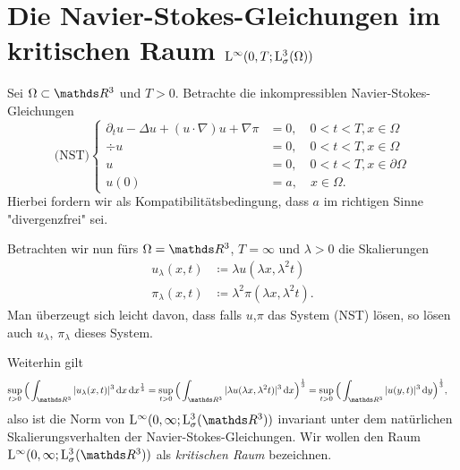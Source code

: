 \chapter{Die Navier-Stokes-Gleichungen im kritischen Raum $\mathrm{L}^\infty(0,T; \mathrm{L}^3_\sigma(\Omega))$}

Sei $\Omega \subset \R^3$ und $T > 0$.
Betrachte die inkompressiblen Navier-Stokes-Gleichungen
$$
\text{(NST)} \begin{cases}
  \partial_t u - \Delta u + (u \cdot \nabla) u + \nabla \pi &= 0, \quad 0 < t < T, x \in \Omega \\
  \div u &= 0, \quad 0 < t < T, x \in \Omega \\
  u &= 0, \quad 0 < t < T, x \in \partial\Omega \\
  u(0) &= a, \quad x \in \Omega.
\end{cases}
$$
Hierbei fordern wir als Kompatibilitätsbedingung, dass $a$ im richtigen Sinne "divergenzfrei" sei.

Betrachten wir nun fürs $\Omega = \R^3$, $T = \infty$ und $\lambda > 0$ die Skalierungen
\begin{align*}
  u_\lambda(x,t)  &\coloneqq \lambda u(\lambda x, \lambda^2 t) \\
  \pi_\lambda(x,t) &\coloneqq \lambda^2 \pi(\lambda x, \lambda^2 t).
\end{align*}
Man überzeugt sich leicht davon, dass falls $u$,$\pi$ das System (NST) lösen, so lösen auch $u_\lambda$, $\pi_\lambda$ dieses System.

Weiterhin gilt
\begin{align*}
  \sup_{t > 0} \Big( \int_{\R^3} |u_\lambda(x,t)|^3 \d x \d x^{\frac{1}{3}} 
  &= \sup_{t > 0} \Big( \int_{\R^3} |\lambda u (\lambda x, \lambda^2 t) |^3 \d x \Big)^{\frac{1}{3}} 
  = \sup_{t > 0} \Big( \int_{\R^3} |u(y,t)|^3 \d y \Big)^{\frac{1}{3}},
  \end{align*}
also ist die Norm von $\Ell^\infty(0,\infty; \Ell_\sigma^3(\R^3))$ invariant unter dem natürlichen Skalierungsverhalten der Navier-Stokes-Gleichungen.
Wir wollen den Raum $\Ell^\infty(0,\infty; \Ell^3_\sigma(\R^3))$ als \emph{kritischen Raum} bezeichnen.

